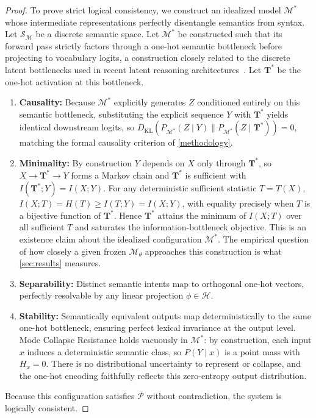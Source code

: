 \begin{proof}
To prove strict logical consistency, we construct an idealized model $\mathcal{M}^*$ whose intermediate representations perfectly disentangle semantics from syntax.
Let $\mathcal{S}_{\mathcal{M}}$ be a discrete semantic space. Let $\mathcal{M}^*$ be constructed such that its forward pass strictly factors through a one-hot semantic bottleneck before projecting to vocabulary logits, a construction closely related to the discrete latent bottlenecks used in recent latent reasoning architectures~\citep{deng2025latentreasoningllmsvocabularyspace}. Let $\mathbf{T}^*$ be the one-hot activation at this bottleneck.
\begin{enumerate}
    \item \textbf{Causality:} Because $\mathcal{M}^*$ explicitly generates $Z$ conditioned entirely on this semantic bottleneck, substituting the explicit sequence $Y$ with $\mathbf{T}^*$ yields identical downstream logits, so $D_{\text{KL}}(P_{\mathcal{M}^*}(Z \mid Y) \parallel P_{\mathcal{M}^*}(Z \mid \mathbf{T}^*)) = 0$, matching the formal causality criterion of \cref{methodology}.
    \item \textbf{Minimality:} By construction $Y$ depends on $X$ only through $\mathbf{T}^*$, so $X \to \mathbf{T}^* \to Y$ forms a Markov chain and $\mathbf{T}^*$ is sufficient with $I(\mathbf{T}^*; Y) = I(X; Y)$. For any deterministic sufficient statistic $T = T(X)$, $I(X; T) = H(T) \geq I(T; Y) = I(X; Y)$, with equality precisely when $T$ is a bijective function of $\mathbf{T}^*$. Hence $\mathbf{T}^*$ attains the minimum of $I(X; T)$ over all sufficient $T$ and saturates the information-bottleneck objective. This is an existence claim about the idealized configuration $\mathcal{M}^*$. The empirical question of how closely a given frozen $\mathcal{M}_\theta$ approaches this construction is what \cref{sec:results} measures.
    \item \textbf{Separability:} Distinct semantic intents map to orthogonal one-hot vectors, perfectly resolvable by any linear projection $\phi \in \mathcal{H}$.
    \item \textbf{Stability:} Semantically equivalent outputs map deterministically to the same one-hot bottleneck, ensuring perfect lexical invariance at the output level. Mode Collapse Resistance holds vacuously in $\mathcal{M}^*$: by construction, each input $x$ induces a deterministic semantic class, so $P(Y \mid x)$ is a point mass with $H_x = 0$. There is no distributional uncertainty to represent or collapse, and the one-hot encoding faithfully reflects this zero-entropy output distribution.
\end{enumerate}
Because this configuration satisfies $\mathcal{P}$ without contradiction, the system is logically consistent.
\end{proof}

